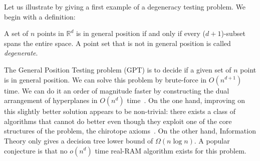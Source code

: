 Let us illustrate by giving a first example of a degeneracy testing problem. We
begin with a definition:

\begin{definition}
A set of \(n\) points in \(\mathbb{R}^d\)
is in general position if and only if every (\(d+1\))-subset spans the entire
space. A point set that is not in general position is called \emph{degenerate}.
\end{definition}

The General Position Testing problem (GPT) is to decide if a given set of
\(n\) point is in general position. We can solve this problem by brute-force in
\(O(n^{d+1})\) time.
We can do it an order of magnitude faster
by constructing the dual arrangement of hyperplanes in
\(O(n^d)\) time~\cite[Theorem 24.4.1]{Hal04}.
%
On the one hand,
improving on this slightly better solution appears to be non-trivial: there
exists a class of algorithms that cannot do better even though they
exploit one of the core structures of the problem, the chirotope axioms~\cite{BLSWZ93}.
%
On the other hand, Information Theory only gives a decision tree
lower bound of \(\Omega(n \log n)\).
A popular conjecture is that no \(o(n^d)\) time real-RAM
algorithm exists for this problem.
